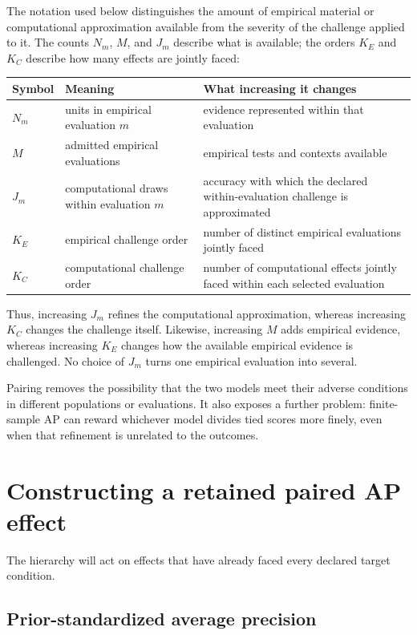 \documentclass[11pt]{article}
\theoremstyle{remark}
\begin{document}
The notation used below distinguishes the amount of empirical material or
computational approximation available from the severity of the challenge
applied to it. The counts $N_m$, $M$, and $J_m$ describe what is available; the
orders $K_E$ and $K_C$ describe how many effects are jointly faced:
\begin{center}
\begin{tabularx}{0.96\textwidth}{@{}l>{\raggedright\arraybackslash}X>{\raggedright\arraybackslash}X@{}}
\toprule
Symbol & Meaning & What increasing it changes \\
\midrule
$N_m$ & units in empirical evaluation $m$ & evidence represented within that evaluation \\
$M$ & admitted empirical evaluations & empirical tests and contexts available \\
$J_m$ & computational draws within evaluation $m$ & accuracy with which the declared within-evaluation challenge is approximated \\
$K_E$ & empirical challenge order & number of distinct empirical evaluations jointly faced \\
$K_C$ & computational challenge order & number of computational effects jointly faced within each selected evaluation \\
\bottomrule
\end{tabularx}
\end{center}
Thus, increasing $J_m$ refines the computational approximation, whereas
increasing $K_C$ changes the challenge itself. Likewise, increasing $M$ adds
empirical evidence, whereas increasing $K_E$ changes how the available
empirical evidence is challenged. No choice of $J_m$ turns one empirical
evaluation into several.

Pairing removes the possibility that the two models meet their adverse
conditions in different populations or evaluations. It also exposes a further
problem: finite-sample AP can reward whichever model divides tied scores more
finely, even when that refinement is unrelated to the outcomes.


\section{Constructing a retained paired AP effect}
\label{sec:paired-effect}

The hierarchy will act on effects that have already faced every declared target
condition.

\subsection{Prior-standardized average precision}
\end{document}
